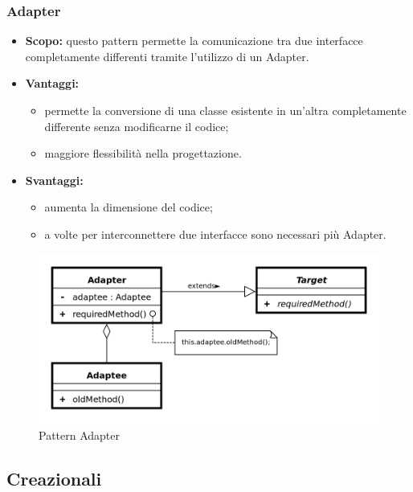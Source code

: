     \subsubsection{Adapter}
      \begin{itemize}
       \item \textbf{Scopo:} questo pattern permette la comunicazione tra due interfacce completamente differenti tramite l'utilizzo di un Adapter.
	\item \textbf{Vantaggi:}
	  \begin{itemize}
	   \item permette la conversione di una classe esistente in un'altra completamente differente senza modificarne il codice;
	   \item maggiore flessibilità nella progettazione.
	  \end{itemize}
	\item \textbf{Svantaggi:}
	  \begin{itemize}
	   \item aumenta la dimensione del codice;
	   \item a volte per interconnettere due interfacce sono necessari più Adapter.
	  \end{itemize}
	\end{itemize}
	\begin{figure}[h]
		\centering
		\includegraphics[width=\textwidth,height=\textheight,keepaspectratio,scale=0.1]{images/adapterpattern.png}
		\caption{Pattern Adapter}\label{fig:adapter1}
	\end{figure}
	\newpage
  \subsection{Creazionali}


